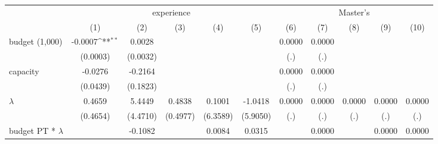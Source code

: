 {
\def\sym#1{\ifmmode^{#1}\else\(^{#1}\)\fi}
\begin{tabular}{l*{10}{c}}
\hline\hline
                    &\multicolumn{5}{c}{experience}                                                                               &\multicolumn{5}{c}{Master's}                                                                                 \\\cmidrule(lr){2-6}\cmidrule(lr){7-11}
                    &\multicolumn{1}{c}{(1)}         &\multicolumn{1}{c}{(2)}         &\multicolumn{1}{c}{(3)}         &\multicolumn{1}{c}{(4)}         &\multicolumn{1}{c}{(5)}         &\multicolumn{1}{c}{(6)}         &\multicolumn{1}{c}{(7)}         &\multicolumn{1}{c}{(8)}         &\multicolumn{1}{c}{(9)}         &\multicolumn{1}{c}{(10)}         \\
\hline
budget (1,000)      &     -0.0007\sym{**} &      0.0028         &                     &                     &                     &      0.0000         &      0.0000         &                     &                     &                     \\
                    &    (0.0003)         &    (0.0032)         &                     &                     &                     &         (.)         &         (.)         &                     &                     &                     \\
[1em]
capacity            &     -0.0276         &     -0.2164         &                     &                     &                     &      0.0000         &      0.0000         &                     &                     &                     \\
                    &    (0.0439)         &    (0.1823)         &                     &                     &                     &         (.)         &         (.)         &                     &                     &                     \\
[1em]
$\lambda$           &      0.4659         &      5.4449         &      0.4838         &      0.1001         &     -1.0418         &      0.0000         &      0.0000         &      0.0000         &      0.0000         &      0.0000         \\
                    &    (0.4654)         &    (4.4710)         &    (0.4977)         &    (6.3589)         &    (5.9050)         &         (.)         &         (.)         &         (.)         &         (.)         &         (.)         \\
[1em]
budget PT * $\lambda$&                     &     -0.1082         &                     &      0.0084         &      0.0315         &                     &      0.0000         &                     &      0.0000         &      0.0000         \\

\end{tabular}}
